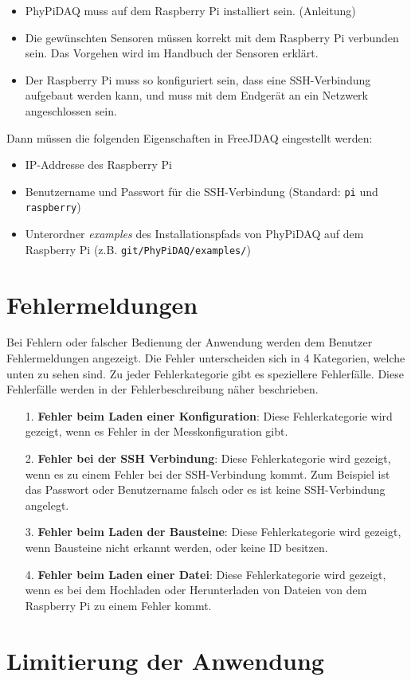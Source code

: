 \documentclass[parskip=full]{scrartcl}
\begin{document}
\begin{itemize}

\item PhyPiDAQ muss auf dem Raspberry Pi installiert sein. (Anleitung)

\item Die gewünschten Sensoren müssen korrekt mit dem Raspberry Pi verbunden sein. Das Vorgehen wird im Handbuch der Sensoren erklärt.

\item Der Raspberry Pi muss so konfiguriert sein, dass eine SSH-Verbindung aufgebaut werden kann, und muss mit dem Endgerät an ein Netzwerk angeschlossen sein.

\end{itemize}

Dann müssen die folgenden Eigenschaften in FreeJDAQ eingestellt werden:

\begin{itemize}

\item IP-Addresse des Raspberry Pi
\item Benutzername und Passwort für die SSH-Verbindung (Standard: \verb:pi: und \verb:raspberry:)
\item Unterordner \textit{examples} des Installationspfads von PhyPiDAQ auf dem Raspberry Pi (z.B. \verb:git/PhyPiDAQ/examples/:)

\end{itemize}

\section{Fehlermeldungen}

Bei Fehlern oder falscher Bedienung der Anwendung werden dem Benutzer Fehlermeldungen angezeigt. Die Fehler unterscheiden sich in 4 Kategorien, welche unten zu sehen sind. Zu jeder Fehlerkategorie gibt es speziellere Fehlerfälle. Diese Fehlerfälle werden in der Fehlerbeschreibung näher beschrieben.

\begin{itemize}


\item[1.] \textbf{Fehler beim Laden einer Konfiguration}: Diese Fehlerkategorie wird gezeigt, wenn es Fehler in der Messkonfiguration gibt.

\item[2.] \textbf{Fehler bei der SSH Verbindung}: Diese Fehlerkategorie wird gezeigt, wenn es zu einem Fehler bei der SSH-Verbindung kommt. Zum Beispiel ist das Passwort oder Benutzername falsch oder es ist keine SSH-Verbindung angelegt.

\item[3.] \textbf{Fehler beim Laden der Bausteine}: Diese Fehlerkategorie wird gezeigt, wenn Bausteine nicht erkannt werden, oder keine ID besitzen.

\item[4.] \textbf{Fehler beim Laden einer Datei}: Diese Fehlerkategorie wird gezeigt, wenn es bei dem Hochladen oder Herunterladen von Dateien von dem Raspberry Pi zu einem Fehler kommt.

\end{itemize}

\section{Limitierung der Anwendung}


\printnoidxglossaries				%
\end{document}
